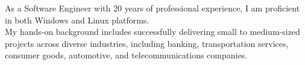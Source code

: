 \par{
As a Software Engineer with 20 years of professional experience, I am proficient in both Windows and Linux platforms.\\
My hands-on background includes successfully delivering small to medium-sized projects across diverse industries, including banking, transportation services, consumer goods, automotive, and telecommunications companies.
}